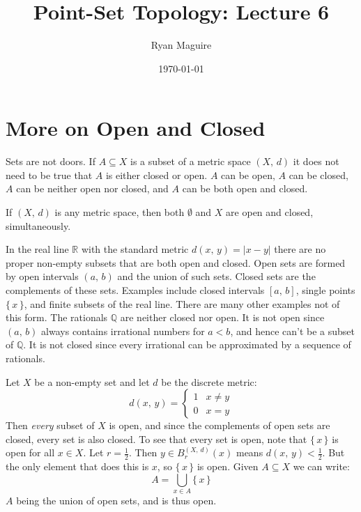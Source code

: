\documentclass{article}
\title{Point-Set Topology: Lecture 6}
\author{Ryan Maguire}
\date{\today}
\theoremstyle{plain}
\theoremstyle{normal}
\newenvironment{example}{%
    \pushQED{\qed}\renewcommand{\qedsymbol}{$\blacksquare$}\examplex%
}{%
    \popQED\endexamplex%
}
\begin{document}
    \maketitle
    \section{More on Open and Closed}
        Sets are not doors. If $A\subseteq{X}$ is a subset of a metric space
        $(X,\,d)$ it does not need to be true that $A$ is either closed or
        open. $A$ can be open, $A$ can be closed, $A$ can be neither open nor
        closed, and $A$ can be both open and closed.
        \begin{example}
            If $(X,\,d)$ is any metric space, then both
            $\emptyset$ and $X$ are open and closed, simultaneously.
        \end{example}
        \begin{example}
            In the real line $\mathbb{R}$ with the standard metric
            $d(x,\,y)=|x-y|$ there are no proper non-empty
            subsets that are both open and closed. Open sets are formed by
            open intervals $(a,\,b)$ and the union of such sets. Closed sets
            are the complements of these sets. Examples include closed
            intervals $[a,\,b]$, single points $\{\,x\,\}$, and finite subsets
            of the real line. There are many other examples not of this form.
            The rationals $\mathbb{Q}$ are neither closed nor open.
            It is not open since $(a,\,b)$ always
            contains irrational numbers for $a<b$, and hence can't be a
            subset of $\mathbb{Q}$. It is not closed since every irrational can
            be approximated by a sequence of rationals.
        \end{example}
        \begin{example}
            Let $X$ be a non-empty set and let $d$ be the discrete metric:
            \begin{equation}
                d(x,\,y)=
                \begin{cases}
                    1&x\ne{y}\\
                    0&x=y
                \end{cases}
            \end{equation}
            Then \textit{every} subset of $X$ is open, and since the complements
            of open sets are closed, every set is also closed. To see that every
            set is open, note that $\{\,x\,\}$ is open for all $x\in{X}$.
            Let $r=\frac{1}{2}$. Then
            $y\in{B}_{r}^{(X,\,d)}(x)$ means $d(x,\,y)<\frac{1}{2}$. But the
            only element that does this is $x$, so $\{\,x\,\}$ is open.
            Given $A\subseteq{X}$ we can write:
            \begin{equation}
                A=\bigcup_{x\in{A}}\{\,x\,\}
            \end{equation}
            $A$ being the union of open sets, and is thus open.
        \end{example}
\end{document}
